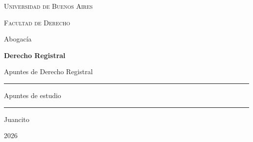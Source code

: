 \documentclass[12pt,oneside]{book}
\newcommand{\universidad}{Universidad de Buenos Aires}
\newcommand{\facultad}{Facultad de Derecho}
\newcommand{\departamento}{Abogacía}
\newcommand{\materia}{Derecho Registral}
\newcommand{\titulo}{Apuntes de \materia}
\newcommand{\autor}{Juancito}
\newcommand{\anio}{2026}
\begin{document}

\begin{titlepage}

\thispagestyle{empty}

\begin{center}

\vspace*{1cm}

%

\vspace{1cm}

{\large \textsc{\universidad}}

\vspace{0.2cm}

{\large \textsc{\facultad}}

\vspace{0.2cm}

{\large \departamento}

\vspace{3cm}

{\Huge \textbf{\materia}}

\vspace{1cm}

{\LARGE \titulo}

\vspace{1.5cm}

\rule{0.70\textwidth}{0.5pt}

\vspace{0.5cm}

{\large Apuntes de estudio}

\vspace{0.5cm}

\rule{0.70\textwidth}{0.5pt}

\vfill

{\large \autor}

\vspace{0.3cm}

{\large \anio}

\end{center}

\end{titlepage}

\end{document}
